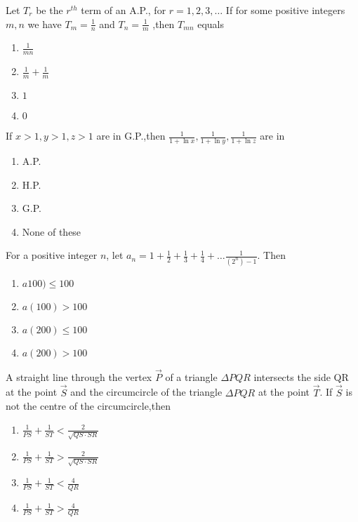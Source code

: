 \item Let $T_r$ be the $r^{th}$ term of an A.P., for $r=1,2,3,\dots$ If for some positive integers $m,n$ we have
$T_m=\frac{1}{n}$ and $T_n=\frac{1}{m}$ ,then $T_{mn}$ equals \hfill{}

\begin{multicols}{4}
\begin{enumerate}
\item $\frac{1}{mn}$
\item $\frac{1}{m} + \frac{1}{m}$
\item $1$
\item $0$
\end{enumerate}
\end{multicols}

\item If $x>1,y>1,z>1$ are in G.P.,then $\frac{1}{1+\ln x},\frac{1}{1+\ln y},\frac{1}{1+\ln z}$ are in 
\hfill{}
\begin{multicols}{4}
\begin{enumerate}
\item A.P.
\item H.P.
\item G.P.
\item None of these
\end{enumerate}
\end{multicols}

\item For a positive integer $n$, let
$a_n=1+\frac{1}{2}+\frac{1}{3}+\frac{1}{4}+\dots\frac{1}{(2^n)-1}$. Then \hfill{}
\begin{multicols}{4}
\begin{enumerate}
\item $a100)\leq 100$
\item $a(100) > 100$
\item $a(200)\leq 100$
\item $a(200) > 100$
\end{enumerate}
\end{multicols}

\item A straight line through the vertex $\vec{P}$ of a triangle $\Delta PQR$ intersects the side QR at the point $\vec{S}$ and the circumcircle of the triangle $\Delta{PQR}$ at the point $\vec{T}$. If $\vec{S}$ is not the centre of the circumcircle,then  \hfill{}
\begin{multicols}{2}
\begin{enumerate}
\item $\frac{1}{PS}+\frac{1}{ST}<\frac{2}{\sqrt{QS \cdot SR}}$
\item $\frac{1}{PS}+\frac{1}{ST}>\frac{2}{\sqrt{QS \cdot SR}}$
\item $\frac{1}{PS}+\frac{1}{ST}<\frac{4}{QR}$
\item $\frac{1}{PS}+\frac{1}{ST}>\frac{4}{QR}$
\end{enumerate}
\end{multicols}

